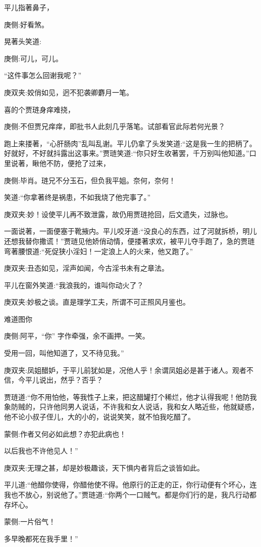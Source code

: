 \begin{parag}
    平儿指著鼻子，\begin{note}庚侧:好看煞。\end{note}晃著头笑道:\begin{note}庚侧:可儿，可儿。\end{note}“这件事怎么回谢我呢？”\begin{note}庚双夹:姣俏如见，迥不犯袭卿麝月一笔。\end{note}喜的个贾琏身痒难挠，\begin{note}庚侧:不但贾兄痒痒，即批书人此刻几乎落笔。试部看官此际若何光景？\end{note}跑上来搂著，“心肝肠肉”乱叫乱谢。平儿仍拿了头发笑道:“这是我一生的把柄了。好就好，不好就抖露出这事来。”贾琏笑道:“你只好生收著罢，千万别叫他知道。”口里说著，瞅他不防，便抢了过来，\begin{note}庚侧:毕肖。琏兄不分玉石，但负我平姐。奈何，奈何！\end{note}笑道:“你拿著终是祸患，不如我烧了他完事了。”\begin{note}庚双夹:妙！设使平儿再不致泄露，故仍用贾琏抢回，后文遗失，过脉也。\end{note}一面说著，一面便塞于靴掖内。平儿咬牙道:“没良心的东西，过了河就拆桥，明儿还想我替你撒谎！”贾琏见他娇俏动情，便搂著求欢，被平儿夺手跑了，急的贾琏弯著腰恨道:“死促狭小淫妇！一定浪上人的火来，他又跑了。”\begin{note}庚双夹:丑态如见，淫声如闻，今古淫书未有之章法。\end{note}平儿在窗外笑道:“我浪我的，谁叫你动火了？\begin{note}庚双夹:妙极之谈。直是理学工夫，所谓不可正照风月鉴也。\end{note}难道图你\begin{note}庚侧:阿平，“你” 字作牵强，余不画押。一笑。\end{note}受用一回，叫他知道了，又不待见我。”\begin{note}庚双夹:凤姐醋妒，于平儿前犹如是，况他人乎！余谓凤姐必是甚于诸人。观者不信，今平儿说出，然乎？否乎？\end{note}贾琏道:“你不用怕他，等我性子上来，把这醋罐打个稀烂，他才认得我呢！他防我象防贼的，只许他同男人说话，不许我和女人说话，我和女人略近些，他就疑惑，他不论小叔子侄儿，大的小的，说说笑笑，就不怕我吃醋了。\begin{note}蒙侧:作者又何必如此想？亦犯此病也！\end{note}以后我也不许他见人！”\begin{note}庚双夹:无理之甚，却是妙极趣谈，天下惧内者背后之谈皆如此。\end{note}平儿道:“他醋你使得，你醋他使不得。他原行的正走的正，你行动便有个坏心，连我也不放心，别说他了。”贾琏道:“你两个一口贼气。都是你们行的是，我凡行动都存坏心。\begin{note}蒙侧:一片俗气！\end{note}多早晚都死在我手里！”
\end{parag}



